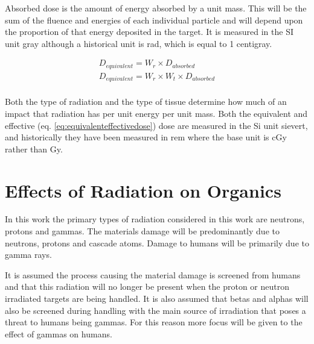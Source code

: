 Absorbed dose is the amount of energy absorbed by a unit mass.  This will be the sum of the fluence and energies of each individual particle and will depend upon the proportion of that energy deposited in the target.  It is measured in the SI unit \gls{gray} although a historical unit is \gls{rad}, which is equal to 1 centigray.

\begin{equation}
\begin{split}
D_{equivalent} = W_{r} \times D_{absorbed} \\
D_{equivalent} = W_{r} \times W_{t} \times D_{absorbed} \\
\label{eq:equivalenteffectivedose}
\end{split}
\end{equation}

Both the type of radiation and the type of tissue determine how much of an impact that radiation has per unit energy per unit mass.  Both the equivalent and effective (eq. \ref{eq:equivalenteffectivedose}) dose are measured in the Si unit \gls{sievert}, and historically they have been measured in \gls{rem} where the base unit is cGy rather than Gy.






\FloatBarrier




\section{Effects of Radiation on Organics}
\label{section:effectsofradiationorg}

In this work the primary types of radiation considered in this work are neutrons, protons and gammas.  The materials damage will be predominantly due to neutrons, protons and cascade atoms.  Damage to humans will be primarily due to gamma rays. 

It is assumed the process causing the material damage is screened from humans and that this radiation will no longer be present when the proton or neutron irradiated targets are being handled.  It is also assumed that betas and alphas will also be screened during handling with the main source of irradiation that poses a threat to humans being gammas.  For this reason more focus will be given to the effect of gammas on humans.



